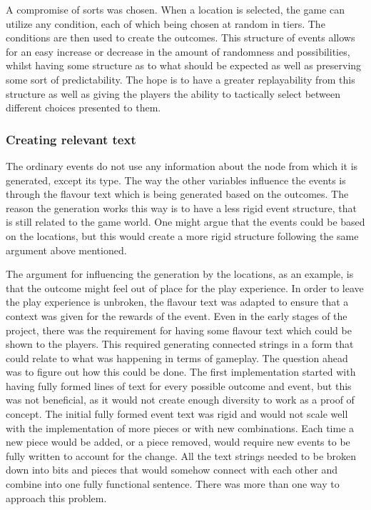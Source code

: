 A compromise of sorts was chosen. When a location is selected, the game can utilize any condition, each of which being chosen at random in tiers. The conditions are then used to create the outcomes. This structure of events allows for an easy increase or decrease in the amount of randomness and possibilities, whilst having some structure as to what should be expected as well as preserving some sort of predictability. The hope is to have a greater replayability from this structure as well as giving the players the ability to tactically select between different choices presented to them.

\subsubsection{Creating relevant text}
The ordinary events do not use any information about the node from which it is generated, except its type. The way the other variables influence the events is through the flavour text which is being generated based on the outcomes. The reason the generation works this way is to have a less rigid event structure, that is still related to the game world.
One might argue that the events could be based on the locations, but this would create a more rigid structure following the same argument above mentioned. 

The argument for influencing the generation by the locations, as an example, is that the outcome might feel out of place for the play experience. In order to leave the play experience is unbroken, the flavour text was adapted to ensure that a context was given for the rewards of the event. Even in the early stages of the project, there was the requirement for having some flavour text which could be shown to the players. This required generating connected strings in a form that could relate to what was happening in terms of gameplay. The question ahead was to figure out how this could be done. The first implementation started with having fully formed lines of text for every possible outcome and event, but this was not beneficial, as it would not create enough diversity to work as a proof of concept. The initial fully formed event text was rigid and would not scale well with the implementation of more pieces or with new combinations. Each time a new piece would be added, or a piece removed, would require new events to be fully written to account for the change. All the text strings needed to be broken down into bits and pieces that would somehow connect with each other and combine into one fully functional sentence. There was more than one way to approach this problem.

